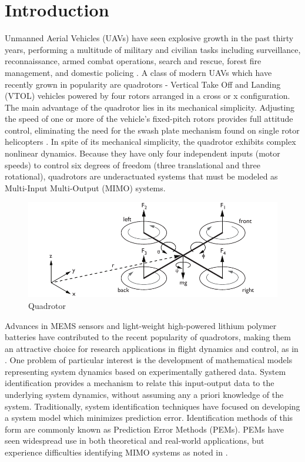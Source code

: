 \chapter{Introduction}

Unmanned Aerial Vehicles (UAVs) have seen explosive growth in the past thirty years, performing a multitude of military and civilian tasks including surveillance, reconnaissance, armed combat operations, search and rescue, forest fire management, and domestic policing \cite{sarris2001survey, valavanis2007advances}. A class of modern UAVs which have recently grown in popularity are quadrotors -  Vertical Take Off and Landing (VTOL) vehicles powered by four rotors arranged in a cross or x configuration. The main advantage of the quadrotor lies in its mechanical simplicity. Adjusting the speed of one or more of the vehicle's fixed-pitch rotors provides full attitude control, eliminating the need for the swash plate mechanism found on single rotor helicopters \cite{bramwell2001bramwell, gupte2012survey}. In spite of its mechanical simplicity, the quadrotor exhibits complex nonlinear dynamics. Because they have only four independent inputs (motor speeds) to control six degrees of freedom (three translational and three rotational), quadrotors are underactuated systems that must be modeled as Multi-Input Multi-Output (MIMO) systems.
\begin{figure}[htb!]
	\centering
	\includegraphics{../fig/quad.pdf}
	\caption{Quadrotor}
\end{figure}


Advances in MEMS sensors and light-weight high-powered lithium polymer batteries have contributed to the recent popularity of quadrotors, making them an attractive choice for research applications in flight dynamics and control, as in \cite{hoffmann2007quadrotor, kivrak2006design, mellinger2010control, michael2010grasp}. One problem of particular interest is the development of mathematical models representing system dynamics based on experimentally gathered data. System identification provides a mechanism to relate this input-output data to the underlying system dynamics, without assuming any a priori knowledge of the system. Traditionally, system identification techniques have focused on developing a system model which minimizes prediction error. Identification methods of this form are commonly known as Prediction Error Methods (PEMs). PEMs have seen widespread use in both theoretical and real-world applications, but experience difficulties identifying MIMO systems as noted in \cite{qin2006overview, viberg1995subspace}. 


